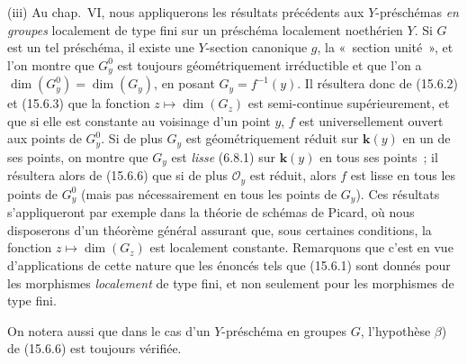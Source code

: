 \begin{remarks}[15.6.10]
(iii) Au chap.~VI, nous appliquerons les résultats précédents aux $Y$-préschémas \emph{en groupes} localement de type fini sur un préschéma localement noethérien $Y$. Si $G$ est un tel préschéma, il existe une $Y$-section canonique $g$, la «~section unité~», et l'on montre que $G_y^0$ est toujours géométriquement irréductible et que l'on a $\dim(G_y^0)=\dim(G_y)$, en posant $G_y=f^{-1}(y)$. Il résultera donc de (15.6.2) et (15.6.3) que la fonction $z\mapsto\dim(G_z)$ est semi-continue supérieurement, et que si elle est constante au voisinage d'un point $y$, $f$ est universellement ouvert aux points de $G_y^0$. Si de plus $G_y$ est géométriquement réduit sur $\mathbf{k}(y)$ en un de ses points, on montre que $G_y$ est \emph{lisse} (6.8.1) sur $\mathbf{k}(y)$ en tous ses points~; il résultera alors de (15.6.6) que si de plus $\mathcal O_y$ est réduit, alors $f$ est lisse en tous les points de $G_y^0$ (mais pas nécessairement en tous les points de $G_y$). Ces résultats s'appliqueront par exemple dans la théorie de schémas de Picard, où nous disposerons d'un théorème général assurant que, sous certaines conditions, la fonction $z\mapsto\dim(G_z)$ est localement constante. Remarquons que c'est en vue d'applications de cette nature que les énoncés tels que (15.6.1) sont donnés pour les morphismes \emph{localement} de type fini, et non seulement pour les morphismes de type fini.

On notera aussi que dans le cas d'un $Y$-préschéma en groupes $G$, l'hypothèse $\beta$) de (15.6.6) est toujours vérifiée.
\end{remarks}


